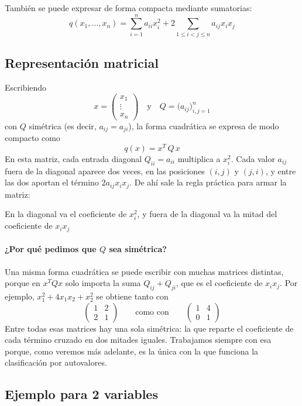 \documentclass{article}
\begin{document}
También se puede expresar de forma compacta mediante sumatorias:
\[
q(x_1,\dots,x_n)
= \sum_{i=1}^n a_{ii}x_i^2
+ 2\sum_{1\le i<j\le n} a_{ij}x_i x_j
\]
\subsection*{Representación matricial}
Escribiendo
\[
x = \begin{pmatrix}x_1\\ \vdots\\ x_n\end{pmatrix}
\quad\text{y}\quad
Q = \bigl(a_{ij}\bigr)_{i,j=1}^n
\]
con \(Q\) simétrica (es decir, \(a_{ij}=a_{ji}\)), la forma cuadrática se expresa de modo compacto como
\[
q(x) = x^T\,Q\,x
\]
En esta matriz, cada entrada diagonal \(Q_{ii}=a_{ii}\) multiplica a \(x_i^2\). Cada valor \(a_{ij}\) fuera de la diagonal aparece dos veces, en las posiciones \((i,j)\) y \((j,i)\), y entre las dos aportan el término \(2a_{ij}x_ix_j\). De ahí sale la regla práctica para armar la matriz:

{\color{teal}
En la diagonal va el coeficiente de \(x_i^2\), y fuera de la diagonal va la mitad del coeficiente de \(x_ix_j\)}

\paragraph*{¿Por qué pedimos que \(Q\) sea simétrica?}
Una misma forma cuadrática se puede escribir con muchas matrices distintas, porque en \(x^TQx\) solo importa la suma \(Q_{ij}+Q_{ji}\), que es el coeficiente de \(x_ix_j\). Por ejemplo, \(x_1^2+4x_1x_2+x_2^2\) se obtiene tanto con
\[
\begin{pmatrix}
1 & 2\\
2 & 1
\end{pmatrix}
\qquad\text{como con}\qquad
\begin{pmatrix}
1 & 4\\
0 & 1
\end{pmatrix}
\]
Entre todas esas matrices hay una sola simétrica: la que reparte el coeficiente de cada término cruzado en dos mitades iguales. Trabajamos siempre con esa porque, como veremos más adelante, es la única con la que funciona la clasificación por autovalores.

\subsection*{Ejemplo para 2 variables}
\end{document}
